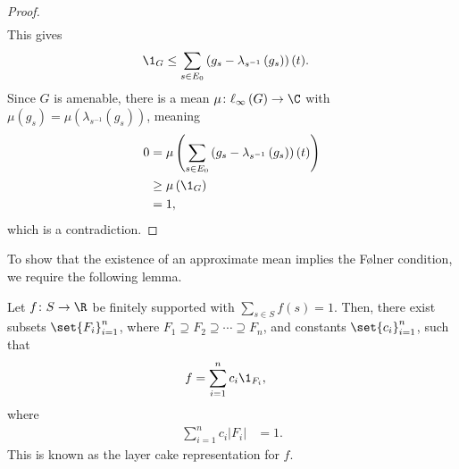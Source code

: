 \begin{proof}
\begin{align*}
  \end{align*}
  This gives
  \begin{align*}
    \1_{G} &\leq \sum_{s\in E_0}\left( g_s - \lambda_{s^{-1}}\left(g_s\right) \right)(t).
  \end{align*}
  Since $G$ is amenable, there is a mean $\mu\colon \ell_{\infty}\left(G\right)\rightarrow \C$ with $\mu\left(g_s\right) = \mu\left(\lambda_{s^{-1}}\left(g_s\right)\right)$, meaning
  \begin{align*}
    0 &= \mu\left(\sum_{s\in E_0}\left(g_s - \lambda_{s^{-1}}\left(g_s\right)\right)\left(t\right)\right)\\
      &\geq \mu\left(\1_{G}\right)\\
      &= 1,
  \end{align*}
  which is a contradiction.
\end{proof}
To show that the existence of an approximate mean implies the Følner condition, we require the following lemma.
\begin{lemma}\label{lemma:layer_cake_representation}
  Let $f\colon S\rightarrow \R$ be finitely supported with $\sum_{s\in S}f(s) = 1$. Then, there exist subsets $\set{F_i}_{i=1}^{n}$, where $F_1\supseteq F_2\supseteq \cdots \supseteq F_n$, and constants $\set{c_i}_{i=1}^{n}$, such that
  \begin{align*}
    f &= \sum_{i=1}^{n}c_i\1_{F_i},
  \end{align*}
  where
  \begin{align*}
    \sum_{i=1}^{n}c_i\left\vert F_i \right\vert &= 1.
  \end{align*}
  This is known as the layer cake representation for $f$.
\end{lemma}
